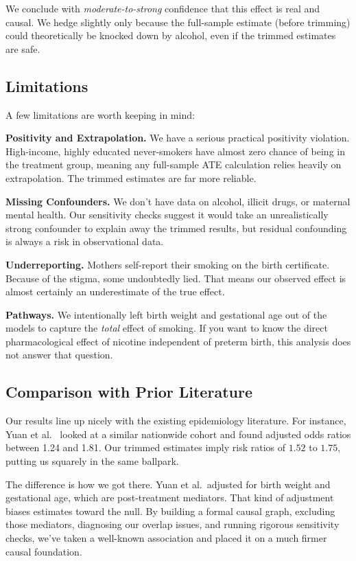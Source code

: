 \documentclass[11pt]{article}
\begin{document}
We conclude with \emph{moderate-to-strong} confidence that this effect is real
and causal. We hedge slightly only because the full-sample estimate (before
trimming) could theoretically be knocked down by alcohol, even if the trimmed
estimates are safe.

\subsection{Limitations}

A few limitations are worth keeping in mind:

\textbf{Positivity and Extrapolation.} We have a serious practical positivity
violation. High-income, highly educated never-smokers have almost zero chance of
being in the treatment group, meaning any full-sample ATE calculation relies heavily
on extrapolation. The trimmed estimates are far more reliable.

\textbf{Missing Confounders.} We don't have data on alcohol, illicit drugs, or
maternal mental health. Our sensitivity checks suggest it would take an unrealistically
strong confounder to explain away the trimmed results, but residual confounding is
always a risk in observational data.

\textbf{Underreporting.} Mothers self-report their smoking on the birth certificate.
Because of the stigma, some undoubtedly lied. That means our observed effect is almost
certainly an underestimate of the true effect.

\textbf{Pathways.} We intentionally left birth weight and gestational age out of
the models to capture the \emph{total} effect of smoking. If you want to know the
direct pharmacological effect of nicotine independent of preterm birth, this analysis
does not answer that question.

\subsection{Comparison with Prior Literature}

Our results line up nicely with the existing epidemiology literature. For instance,
Yuan et al.~\cite{yuan2023} looked at a similar nationwide cohort and found adjusted
odds ratios between 1.24 and 1.81. Our trimmed estimates imply risk ratios of
$1.52$ to $1.75$, putting us squarely in the same ballpark.

The difference is how we got there. Yuan et al.\ adjusted for birth weight and
gestational age, which are post-treatment mediators. That kind of adjustment biases
estimates toward the null. By building a formal causal graph, excluding those
mediators, diagnosing our overlap issues, and running rigorous sensitivity checks,
we've taken a well-known association and placed it on a much firmer causal
foundation.
\end{document}
